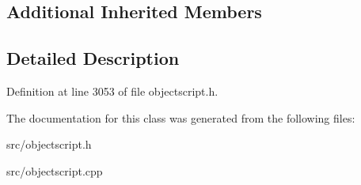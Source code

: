 \subsection*{Additional Inherited Members}


\subsection{Detailed Description}


Definition at line 3053 of file objectscript.\+h.



The documentation for this class was generated from the following files\+:\begin{DoxyCompactItemize}
\item 
src/objectscript.\+h\item 
src/objectscript.\+cpp\end{DoxyCompactItemize}
